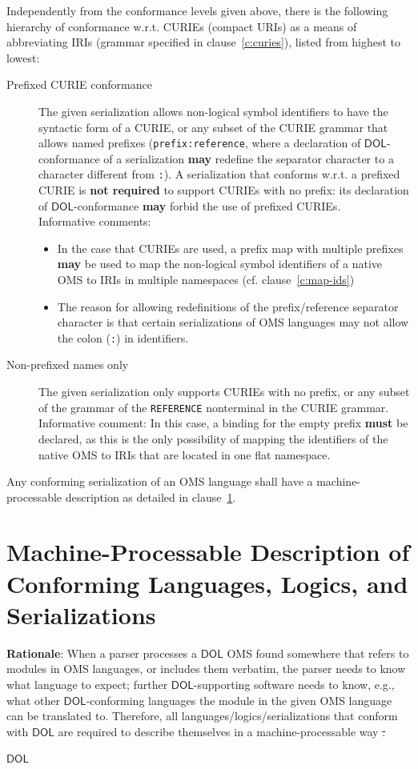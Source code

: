 \documentclass[10pt,fleqn,final]{scrreprt}
\makeatletter
\newcommand*{\cf}{cf.\@\xspace}
\newcommand*{\wrt}{w.r.t.\@\xspace}
\newcommand*{\syntax}[1]{\texttt{#1}}
\newcommand*{\notrequired}{\textbf{not required}\xspace}
\newcommand*{\may}{\textbf{may}\xspace}
\newcommand*{\hasto}{\textbf{must}\xspace}
\newcommand*{\DOL}{\ensuremath{\mathsf{DOL}}\xspace}
\newcommand{\clauserefname}{clause}
\newcommand{\cref}[1]{\clauserefname~\ref{#1}}
\newcommand{\sclause}[1]{\section{#1}}
\providecommand{\DIFadd}[1]{{\protect\color{blue}\uwave{#1}}} %
\providecommand{\DIFdel}[1]{{\protect\color{red}\sout{#1}}}                      %
\providecommand{\DIFaddbegin}{} %
\providecommand{\DIFaddend}{} %
\providecommand{\DIFdelbegin}{} %
\providecommand{\DIFdelend}{} %
\makeatother
\begin{document}
Independently from the conformance levels given above, there is the following hierarchy of conformance \wrt CURIEs (compact URIs) as a means of abbreviating IRIs (grammar specified in \cref{c:curies}), listed from highest to lowest:
\begin{description}
\item[Prefixed CURIE conformance] The given serialization allows non-logical symbol identifiers to have the syntactic form of a CURIE, or any subset of the CURIE grammar that allows named prefixes (\syntax{prefix:reference}, where a declaration of \DOL-conformance of a serialization \may redefine the separator character to a character different from \syntax{:}).  A serialization that conforms \wrt a prefixed CURIE  is \notrequired to support CURIEs with no prefix: its declaration of \DOL-conformance \may forbid the use of prefixed CURIEs.\\
  Informative comments:
  \begin{itemize}
  \item In the case that CURIEs are used, a prefix map with multiple prefixes \may be used to map the non-logical symbol identifiers of a native OMS to IRIs in multiple namespaces (\cf \cref{c:map-ids})
  \item The reason for allowing redefinitions of the prefix/reference separator character is that certain serializations of OMS languages may not allow the colon (\syntax{:}) in identifiers.
  \end{itemize}
\item[Non-prefixed names only] The given serialization only supports CURIEs with no prefix, or any subset of the grammar of the \syntax{REFERENCE} nonterminal in the CURIE grammar.\\
  Informative comment: In this case, a binding for the empty prefix \hasto be declared, as this is the only possibility of mapping the identifiers of the native OMS to IRIs that are located in one flat namespace.
\end{description}

Any conforming serialization of an OMS language shall have a machine-processable description as detailed in \cref{c:conform:description}.

\sclause{Machine-Processable Description of Conforming Languages, Logics, and Serializations}\label{c:conform:description}

\begin{fminipage}{\textwidth}
\textbf{Rationale}: When a parser processes a \DOL OMS found somewhere that refers to modules in OMS languages, or includes them verbatim, the parser needs to know what language to expect; further \DOL-supporting software needs to know, e.g., what other \DOL-conforming languages the module in the given OMS language can be translated to.  Therefore,   all languages/logics/serializations that conform with \DOL are required to describe themselves in a machine-processable way \DIFdelbegin \DIFdel{.
}%

\DIFdelend \DIFaddbegin \DIFadd{and to be 
registered in the }\DOL \DIFadd{registry.
}\DIFaddend \end{fminipage}
\end{document}
